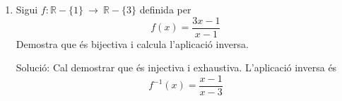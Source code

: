 \begin{enumerate}
\item Sigui $f:\mathbb{R}-\{1\}~\longrightarrow ~\mathbb{R}-\{3\}$ definida
per%
\begin{equation*}
f(x)=\frac{3x-1}{x-1}
\end{equation*}%
Demostra que \'{e}s bijectiva i calcula l'aplicaci\'{o} inversa.

Soluci\'{o}: Cal demostrar que \'{e}s injectiva i exhaustiva. L'aplicaci\'{o}
inversa \'{e}s%
\begin{equation*}
f^{-1}(x)=\frac{x-1}{x-3}
\end{equation*}
\end{enumerate}

